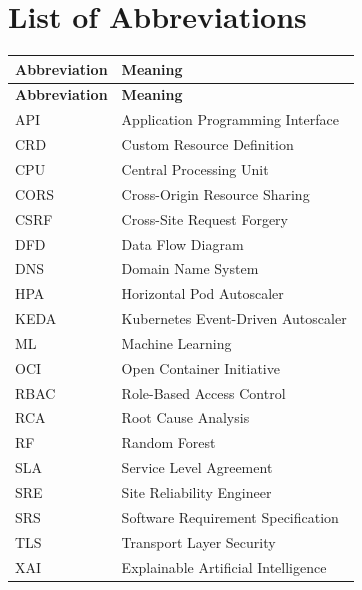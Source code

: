 \chapter*{List of Abbreviations}

\setlength{\parindent}{0pt}

\renewcommand{\arraystretch}{1.5}
\setlength{\tabcolsep}{12pt}

\begin{xltabular}{\textwidth}{|p{0.25\textwidth}|X|}

\hline
\textbf{Abbreviation} & \textbf{Meaning} \\ \hline
\endfirsthead

\hline
\textbf{Abbreviation} & \textbf{Meaning} \\ \hline
\endhead

API & Application Programming Interface \\ \hline
CRD & Custom Resource Definition \\ \hline
CPU & Central Processing Unit \\ \hline
CORS & Cross-Origin Resource Sharing \\ \hline
CSRF & Cross-Site Request Forgery \\ \hline
DFD & Data Flow Diagram \\ \hline
DNS & Domain Name System \\ \hline
HPA & Horizontal Pod Autoscaler \\ \hline
KEDA & Kubernetes Event-Driven Autoscaler \\ \hline
ML & Machine Learning \\ \hline
OCI & Open Container Initiative \\ \hline
RBAC & Role-Based Access Control \\ \hline
RCA & Root Cause Analysis \\ \hline
RF & Random Forest \\ \hline
SLA & Service Level Agreement \\ \hline
SRE & Site Reliability Engineer \\ \hline
SRS & Software Requirement Specification \\ \hline
TLS & Transport Layer Security \\ \hline
XAI & Explainable Artificial Intelligence \\ \hline

\end{xltabular}